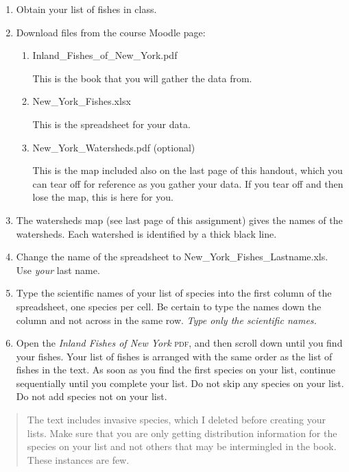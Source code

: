 \documentclass[12pt]{exam}
\begin{document}
\begin{enumerate}
\item
  Obtain your list of fishes in class.
\item
  Download files from the course Moodle page:

  \begin{enumerate}
  \def\labelenumii{\arabic{enumii}.}
  \item 
  	Inland\_Fishes\_of\_New\_York.pdf
  	
  	This is the book that you will gather the data from.
  \item
    New\_York\_Fishes.xlsx
    
    This is the spreadsheet for your data.
    
  \item
    New\_York\_Watersheds.pdf (optional)
    
    This is the map included also on the last page of this handout, which you can tear off for reference as you gather your data. 
    If you tear off and then lose the map, this is here for you.
    
  \end{enumerate}
\item
  The watersheds map (see last page of this assignment) gives 
  the names of the watersheds. Each watershed is identified by 
  a thick black line.
\item
  Change the name of the spreadsheet to New\_York\_Fishes\_Lastname.xls.
  Use \emph{your} last name.
\item
  Type the scientific names of your list of species into the first
  column of the spreadsheet, one species per cell. Be certain to 
  type the names down the column and not across in the same row. 
  \emph{Type only the scientific names.}
\item
  Open the \textit{Inland Fishes of New York} \textsc{pdf}, and then scroll down until you find your fishes. Your list of fishes is
  arranged with the same order as the list of fishes in the text. As soon as you find the first species on your list, 
  continue sequentially until you complete your list. Do not skip 
  any species on your list. Do not add species not on your list.
\end{enumerate}

\begin{quote}
The text includes invasive species, which I deleted
before creating your lists. Make sure that you are only getting
distribution information for the species on your list and not 
others that may be intermingled in the book. These instances 
are few.
\end{quote}
\end{document}

